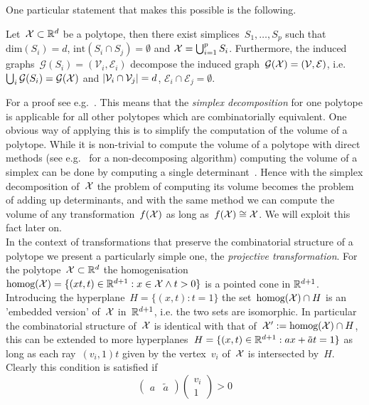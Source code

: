 %
One particular statement that makes this possible is the following.
%
\begin{thm}
Let~$\mathcal X\subset\mathbb R^d$ be a polytope, then there exist simplices~$S_1,\dots,S_p$ such that $\text{dim}(S_i)=d$, $\text{int}(S_i\cap S_j)=\emptyset$ and $\mathcal X=\bigcup_{i=1}^p S_i$.
%
Furthermore, the induced graphs~$\mathcal G(S_i)=(\mathcal V_i,\mathcal E_i)$ decompose the induced graph~$\mathcal G(\mathcal X)=(\mathcal V,\mathcal E)$, i.e.~$\bigcup_i \mathcal G(S_i) = \mathcal G(\mathcal X)$ and $\left|\mathcal V_i\cap \mathcal V_j\right|=d$, $\mathcal E_i\cap\mathcal E_j=\emptyset$.
\end{thm}
%
\noindent For a proof see e.g.~\cite{Hadwiger:1957,Ziegler:1995}.
%
This means that the \emph{simplex decomposition} for one polytope is applicable for all other polytopes which are combinatorially equivalent.
%
One obvious way of applying this is to simplify the computation of the volume of a polytope.
%
While it is non-trivial to compute the volume of a polytope with direct methods (see e.g.~\cite{Lasserre:2001} for a non-decomposing algorithm) computing the volume of a simplex can be done by computing a single determinant~\cite{Hadwiger:1957}.
%
Hence with the simplex decomposition of~$\mathcal X$ the problem of computing its volume becomes the problem of adding up determinants, and with the same method we can compute the volume of any transformation~$f(\mathcal X)$ as long as~$f(\mathcal X)\cong\mathcal X$.
%
We will exploit this fact later on.
%
\\[1em]
%
\mysplit In the context of transformations that preserve the combinatorial structure of a polytope we present a particularly simple one, the \emph{projective transformation}.
%
For the polytope~$\mathcal X\subset\mathbb R^d$ the homogenisation~$\text{homog}(\mathcal X)=\{(xt,t)\in\mathbb R^{d+1}:x\in\mathcal X\wedge t>0\}$ is a pointed cone in $\mathbb R^{d+1}$.
%
Introducing the hyperplane~$H = \{(x,t):t=1\}$ the set~$\text{homog}(\mathcal X)\cap H$ is an 'embedded version' of~$\mathcal X$ in~$\mathbb R^{d+1}$, i.e. the two sets are isomorphic.
%
In particular the combinatorial structure of~$\mathcal X$ is identical with that of~$\mathcal X^\prime:=\text{homog}(\mathcal X)\cap H$, this can be extended to more hyperplanes~$H = \{(x,t)\in\mathbb R^{d+1}:ax+\tilde a t=1\}$ as long as each ray~$(v_i,1)t$ given by the vertex~$v_i$ of~$\mathcal X$ is intersected by~$H$.
%
Clearly this condition is satisfied if
%
\begin{equation}
	\begin{pmatrix}
	a &\tilde a
	\end{pmatrix}\begin{pmatrix}
	v_i\\ 1\end{pmatrix}>0
\end{equation}
